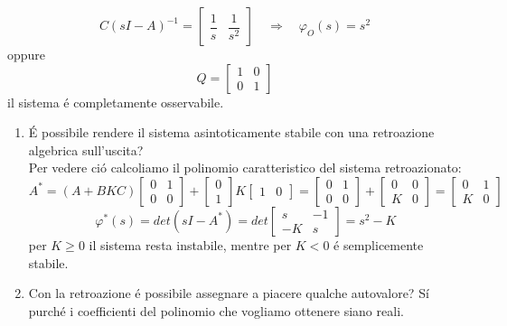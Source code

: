 \documentclass[../main.tex]{subfiles}
\begin{document}
\begin{mdframed}[style=Exercise]
\begin{Exercise}[title={Retroazione algebrica sull'uscita}, difficulty=1]
\begin{itemize}
						\[
							C(sI-A)^{-1} = 
							\begin{bmatrix}
								\dfrac{1}{s} & \dfrac{1}{s^2}
							\end{bmatrix}
							\quad\Rightarrow\quad \varphi_O(s) = s^2
						\]
						oppure
						\[
							Q =
							\begin{bmatrix}
								1 & 0\\
								0 & 1
							\end{bmatrix}
						\]
						il sistema \'e completamente osservabile.
				\end{itemize}
				\begin{enumerate}
					\item 
						\'E possibile rendere il sistema asintoticamente stabile con una retroazione algebrica sull'uscita?\\
						Per vedere ci\'o calcoliamo il polinomio caratteristico del sistema retroazionato:
						\[
							A^{*}=(A+BKC)
							\begin{bmatrix}
								0 & 1\\
								0 & 0
							\end{bmatrix} +
							\begin{bmatrix}
								0\\
								1
							\end{bmatrix} K
							\begin{bmatrix}
								1 & 0
							\end{bmatrix} =
							\begin{bmatrix}
								0 & 1\\
								0 & 0
							\end{bmatrix} +
							\begin{bmatrix}
								0 & 0\\
								K & 0
							\end{bmatrix} =
							\begin{bmatrix}
								0 & 1\\
								K & 0
							\end{bmatrix}
						\]
						\[
							\varphi^{*}(s) = det(sI-A^{*}) = det
							\begin{bmatrix}
								s & -1\\
								-K & s
							\end{bmatrix} = s^2 - K
						\]
						per $ K \geq 0 $ il sistema resta instabile, mentre per $ K < 0 $ \'e semplicemente stabile.
					\item 
						Con la retroazione \'e possibile assegnare a piacere qualche autovalore?
						S\'i purch\'e i coefficienti del polinomio che vogliamo ottenere siano reali.
				\end{enumerate}
			\end{Exercise}
		\end{mdframed}
	
\end{document}
